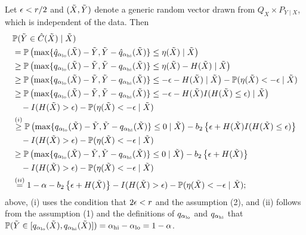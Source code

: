 Let $\epsilon < r / 2$ and $(\tilde{X}, \tilde{Y})$ denote a generic random vector drawn from
$Q_{X}\times P_{Y\mid X}$, which is independent of the data. Then
\begin{align}
  &\mathbb{P}(\tilde{Y} \in \hat{C}(\tilde{X}) \mid \tilde{X})\nonumber\\
  & = \mathbb{P}\left(\max\{\hat{q}_{\alpha_{\mathrm{lo}}}(\tilde{X}) - \tilde{Y}, \tilde{Y} - \hat{q}_{\alpha_{\mathrm{hi}}}(\tilde{X})\}\le \eta(\tilde{X})\mid \tilde{X}\right)\nonumber\\
  &\ge \mathbb{P}\left(\max\{q_{\alpha_{\mathrm{lo}}}(\tilde{X}) - \tilde{Y}, \tilde{Y} - q_{\alpha_{\mathrm{hi}}}(\tilde{X})\}\le \eta(\tilde{X}) - H(\tilde{X})\mid \tilde{X}\right)\nonumber\\
  & \ge \mathbb{P}\left(\max\{q_{\alpha_{\mathrm{lo}}}(\tilde{X}) - \tilde{Y}, \tilde{Y} - q_{\alpha_{\mathrm{hi}}}(\tilde{X})\}\le -\epsilon - H(\tilde{X})\mid \tilde{X}\right) - \mathbb{P}(\eta(\tilde{X}) < -\epsilon\mid \tilde{X})\nonumber\\
  & \ge \mathbb{P}\left(\max\{q_{\alpha_{\mathrm{lo}}}(\tilde{X}) - \tilde{Y}, \tilde{Y} - q_{\alpha_{\mathrm{hi}}}(\tilde{X})\}\le -\epsilon - H(\tilde{X})I(H(\tilde{X})\le \epsilon)\mid \tilde{X}\right)\nonumber\\
  & \quad - I(H(\tilde{X}) > \epsilon) - \mathbb{P}(\eta(\tilde{X}) < -\epsilon\mid \tilde{X})\nonumber\\
  & \stackrel{(i)}{\ge}\mathbb{P}\left(\max\{q_{\alpha_{\mathrm{lo}}}(\tilde{X}) - \tilde{Y}, \tilde{Y} - q_{\alpha_{\mathrm{hi}}}(\tilde{X})\}\le 0 \mid \tilde{X}\right) - b_{2}\left\{\epsilon + H(\tilde{X})I(H(\tilde{X})\le \epsilon)\right\}\nonumber\\
  & \quad - I(H(\tilde{X}) > \epsilon) - \mathbb{P}(\eta(\tilde{X}) < -\epsilon\mid \tilde{X})\nonumber\\
  & \ge \mathbb{P}\left(\max\{q_{\alpha_{\mathrm{lo}}}(\tilde{X}) - \tilde{Y}, \tilde{Y} - q_{\alpha_{\mathrm{hi}}}(\tilde{X})\}\le 0 \mid \tilde{X}\right) - b_{2}\left\{\epsilon + H(\tilde{X})\right\}\nonumber\\
  & \quad - I(H(\tilde{X}) > \epsilon) - \mathbb{P}(\eta(\tilde{X}) < -\epsilon \mid \tilde{X})\nonumber\\
  & \stackrel{(ii)}{=} 1 - \alpha - b_{2}\left\{\epsilon + H(\tilde{X})\right\} - I(H(\tilde{X}) > \epsilon) - \mathbb{P}(\eta(\tilde{X}) < -\epsilon \mid \tilde{X}); \label{eq:conditional_coverage}
\end{align}
above, (i) uses the condition that $2\epsilon < r$ and the assumption
(2), and (ii) follows from the assumption (1) and the definitions of $q_{\alpha_{\mathrm{lo}}}$ and $q_{\alpha_{\mathrm{hi}}}$ that $\mathbb{P}(\tilde{Y}\in [q_{\alpha_{\mathrm{lo}}}(\tilde{X}), q_{\alpha_{\mathrm{hi}}}(\tilde{X})]) = \alpha_{\mathrm{hi}} - \alpha_{\mathrm{lo}} = 1 - \alpha$. %

